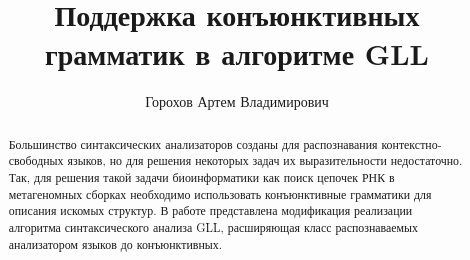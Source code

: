 \title{Поддержка конъюнктивных грамматик в алгоритме GLL}


\author{Горохов Артем Владимирович}



\maketitle             

\begin{abstract}
Большинство синтаксических анализаторов созданы для распознавания контекстно-свободных языков,
но для решения некоторых задач их выразительности недостаточно. 
Так, для решения такой задачи биоинформатики как поиск цепочек РНК в метагеномных сборках необходимо 
использовать конъюнктивные грамматики для описания искомых структур. 
В работе представлена модификация реализации алгоритма синтаксического 
анализа GLL, расширяющая класс распознаваемых анализатором языков до конъюнктивных. 
\end{abstract}








